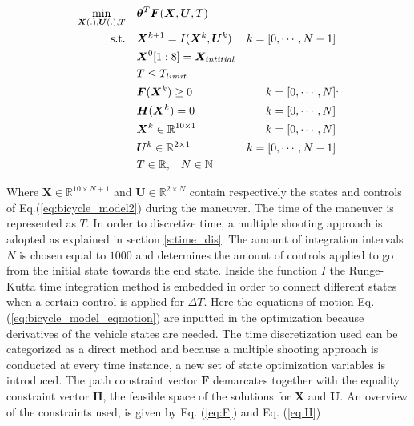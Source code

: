 
\begin{equation}\label{opt:basic_opti_w}
\begin{aligned}
\min_{\bm{X}(.),\bm{U}(.), T} \quad &  \bm{\theta}^T\bm{F}(\bm{X},\bm{U}, T) \\
\textrm{s.t.} \quad & \bm{X}^{k+1} = I(\bm{X}^{k}, \bm{U}^{k}) & k = [0,\cdots, N-1]\\
& \bm{X}^{0}[1:8]= \bm{X}_{intitial} \\
& T \leq T_{limit}\\
& \bm{F}(\bm{X}^{k}) \geq 0	& k = [0,\cdots, N]\\
& \bm{H}(\bm{X}^{k}) = 0	& k = [0,\cdots, N]\\
& \bm{X}^{k}\in \mathbb{R}^{10\times 1}  & k = [0,\cdots, N]\\
& \bm{U}^{k}\in \mathbb{R}^{2\times 1} \hspace{3 mm} & k = [0,\cdots, N-1]\\
& T \in \mathbb{R},\hspace{3 mm} N \in \mathbb{N}
\end{aligned}.
\end{equation}

Where $\bm{X} \in \mathbb{R}^{10\times N+1}$ and $\bm{U}\in \mathbb{R}^{2\times N}$ contain respectively the states and controls of Eq.(\ref{eq:bicycle_model2}) during the maneuver. The time of the maneuver is represented as $T$. In order to discretize time, a multiple shooting approach is adopted as explained in section \ref{s:time_dis}. The amount of integration intervals $N$ is chosen equal to $1000$ and determines the  amount of controls applied to go from the initial state towards the end state. 
Inside the function $I$ the Runge-Kutta time integration method is embedded in order to connect different states when a certain control is applied for $\Delta T$. Here the equations of motion Eq. (\ref{eq:bicycle_model_eqmotion}) are inputted in the optimization because derivatives of the vehicle states are needed. The time discretization used can be categorized as a direct method and because a multiple shooting approach is conducted at every time instance, a new set of state optimization variables is introduced. The path constraint vector $\bm{F}$ demarcates together with the equality constraint vector $\bm{H}$, the feasible space of the solutions for $\bm{X}$ and $\bm{U}$. An overview of the constraints used, is given by Eq. (\ref{eq:F}) and Eq. (\ref{eq:H})

